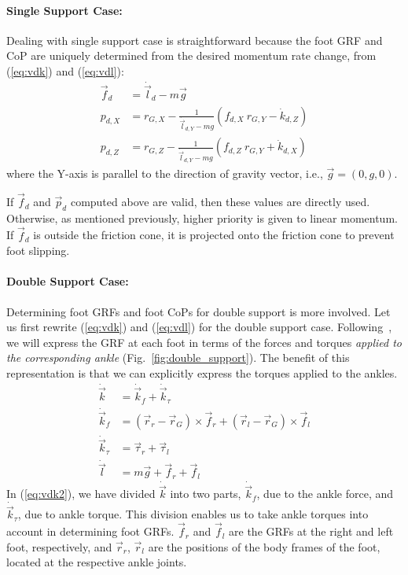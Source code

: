 \documentclass{llncs}
\newcommand{\vg}{\vec{g}}
\newcommand{\vp}{\vec{p}}
\newcommand{\vr}{\vec{r}}
\newcommand{\vtau}{\vec{\tau}}
\newcommand{\vf}{\vec{f}}
\newcommand{\vdk} {\dot{\vec{k}}}
\newcommand{\vdl} {\dot{\vec{l}}}
\begin{document}
\paragraph{Single Support Case:}
Dealing with single support case is straightforward
because the foot GRF and CoP are uniquely determined
from the desired momentum rate change, from (\ref{eq:vdk}) and (\ref{eq:vdl}):
\begin{align}
  \vf_d &= \vdl_d - m\vg \label{eq:vf_d}\\
	p_{d,X} &= r_{G,X} - \frac{1}{\vdl_{d,Y} - mg} ( f_{d,X}\: r_{G,Y} - \dot{k}_{d,Z} )\label{eq:pdx}\\
	p_{d,Z} &= r_{G,Z} - \frac{1}{\vdl_{d,Y} - mg} ( f_{d,Z}\: r_{G,Y} + \dot{k}_{d,X} ) \label{eq:pdz}
\end{align}
where the Y-axis is parallel to the direction of gravity vector, i.e., $\vg=(0,g,0)$.

If $\vf_d$ and $\vp_d$ computed above are valid, then these
values are directly used. Otherwise, as mentioned previously, higher priority is given to linear
momentum. If $\vf_d$ is outside the friction cone, it is projected
onto the friction cone to prevent foot slipping.


\paragraph{Double Support Case:}
Determining foot GRFs and foot CoPs for double support is more involved.
Let us first rewrite (\ref{eq:vdk}) and (\ref{eq:vdl}) for the double support case.
Following~\cite{Sano90}, we will express the GRF at each foot
in terms of the forces and torques \textit{applied to the corresponding ankle} (Fig.~\ref{fig:double_support}). The benefit of this representation
is that we can explicitly express the torques applied to the ankles.
\begin{align}
	\vdk &= \vdk_f + \vdk_\tau \label{eq:vdk2}\\
	\vdk_f &= (\vr_r-\vr_G)\times \vf_r + (\vr_l-\vr_G)\times \vf_l \label{eq:vdk_f} \\
	\vdk_\tau &= \vtau_r + \vtau_l\\
	\vdl &= m\vg + \vf_r + \vf_l \label{eq:vdl2}
\end{align}
In (\ref{eq:vdk2}), we have divided $\vdk$ into two parts,
$\vdk_f$, due to the ankle force, and $\vdk_\tau$, due to ankle torque.
This division enables us to take ankle torques into account
in determining foot GRFs. $\vf_r$ and $\vf_l$ are the GRFs at the right
and left foot, respectively, and $\vr_r$, $\vr_l$ are
the positions of the body frames of the foot, located at the respective ankle joints.
\end{document}
